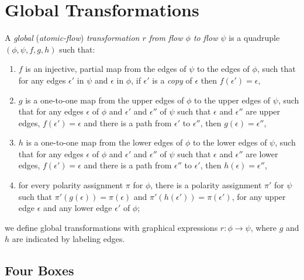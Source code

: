 \section{Global Transformations}

\begin{definition}
A \emph{global} (\emph{atomic-flow}) \emph{transformation $r$ from flow $\phi$ to flow $\psi$} is a quadruple $(\phi,\psi,f,g,h)$ such that:
\begin{enumerate}
\item $f$ is an injective, partial map from the edges of $\psi$ to the edges of $\phi$, such that for any edges $\epsilon'$ in $\psi$ and $\epsilon$ in $\phi$, if $\epsilon'$ is a \emph{copy} of $\epsilon$ then $f(\epsilon')=\epsilon$,
\item $g$ is a one-to-one map from the upper edges of $\phi$ to the upper edges of $\psi$, such that for any edges $\epsilon$ of $\phi$ and $\epsilon'$ and $\epsilon''$ of $\psi$ such that $\epsilon$ and $\epsilon''$ are upper edges, $f(\epsilon')=\epsilon$ and there is a path from $\epsilon'$ to $\epsilon''$, then $g(\epsilon)=\epsilon''$,
\item $h$ is a one-to-one map from the lower edges of $\phi$ to the lower edges of $\psi$, such that for any edges $\epsilon$ of $\phi$ and $\epsilon'$ and $\epsilon''$ of $\psi$ such that $\epsilon$ and $\epsilon''$ are lower edges, $f(\epsilon')=\epsilon$ and there is a path from $\epsilon''$ to $\epsilon'$, then $h(\epsilon)=\epsilon''$,
\item for every polarity assignment $\pi$ for $\phi$, there is a polarity assignment $\pi'$ for $\psi$ such that $\pi'(g(\epsilon))=\pi(\epsilon)$ and $\pi'(h(\epsilon'))=\pi(\epsilon')$, for any upper edge $\epsilon$ and any lower edge $\epsilon'$ of $\phi$;
\end{enumerate}
we define global transformations with graphical expressions $r\colon\phi\to\psi$, where $g$ and $h$ are indicated by labeling edges.
\end{definition}

\subsection{Four Boxes}


